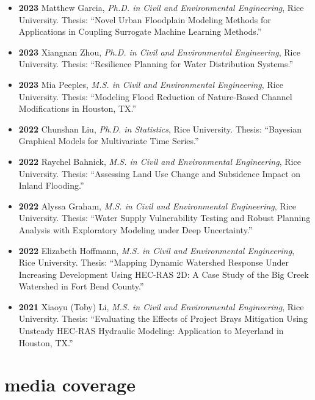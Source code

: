 \documentclass[10pt,oneside]{article}
\begin{document}
\begin{itemize}[label={}]
  \item \textbf{2023} \quad Matthew Garcia, \textit{Ph.D. in Civil and Environmental Engineering}, Rice University. Thesis: \enquote{Novel Urban Floodplain Modeling Methods for Applications in Coupling Surrogate Machine Learning Methods.}

  \item \textbf{2023} \quad Xiangnan Zhou, \textit{Ph.D. in Civil and Environmental Engineering}, Rice University. Thesis: \enquote{Resilience Planning for Water Distribution Systems.}

  \item \textbf{2023} \quad Mia Peeples, \textit{M.S. in Civil and Environmental Engineering}, Rice University. Thesis: \enquote{Modeling Flood Reduction of Nature-Based Channel Modifications in Houston, TX.}

  \item \textbf{2022} \quad Chunshan Liu, \textit{Ph.D. in Statistics}, Rice University. Thesis: \enquote{Bayesian Graphical Models for Multivariate Time Series.}

  \item \textbf{2022} \quad Raychel Bahnick, \textit{M.S. in Civil and Environmental Engineering}, Rice University. Thesis: \enquote{Assessing Land Use Change and Subsidence Impact on Inland Flooding.}

  \item \textbf{2022} \quad Alyssa Graham, \textit{M.S. in Civil and Environmental Engineering}, Rice University. Thesis: \enquote{Water Supply Vulnerability Testing and Robust Planning Analysis with Exploratory Modeling under Deep Uncertainty.}

  \item \textbf{2022} \quad Elizabeth Hoffmann, \textit{M.S. in Civil and Environmental Engineering}, Rice University. Thesis: \enquote{Mapping Dynamic Watershed Response Under Increasing Development Using HEC-RAS 2D: A Case Study of the Big Creek Watershed in Fort Bend County.}

  \item \textbf{2021} \quad Xiaoyu (Toby) Li, \textit{M.S. in Civil and Environmental Engineering}, Rice University. Thesis: \enquote{Evaluating the Effects of Project Brays Mitigation Using Unsteady HEC-RAS Hydraulic Modeling: Application to Meyerland in Houston, TX.}

\end{itemize}


\section{media coverage}
\end{document}

